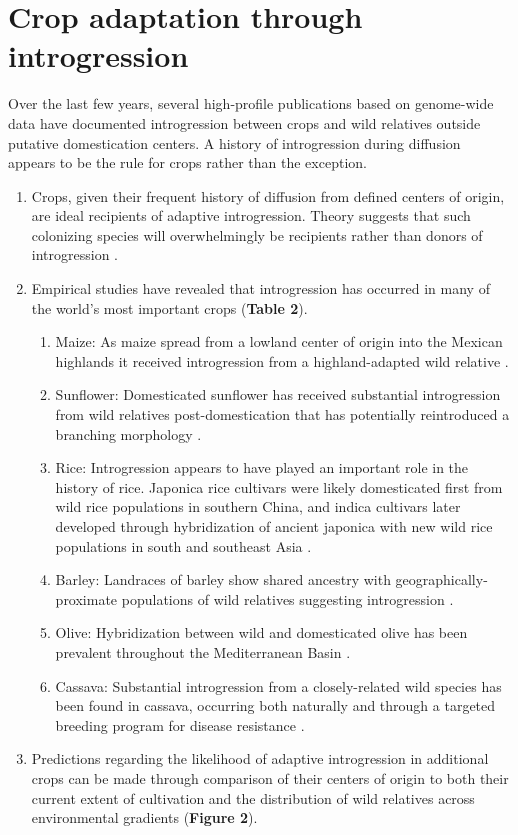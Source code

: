 \documentclass[11pt]{article}
\begin{document}
\section*{Crop adaptation through introgression}
Over the last few years, several high-profile publications based on genome-wide data have documented introgression between crops and wild relatives outside putative domestication centers. A history of introgression during diffusion appears to be the rule for crops rather than the exception.
\begin{enumerate}
	\item{Crops, given their frequent history of diffusion from defined centers of origin, are ideal recipients of adaptive introgression. Theory suggests that such colonizing species will overwhelmingly be recipients rather than donors of introgression \cite{Currat2008}.}
	\item{Empirical studies have revealed that introgression has occurred in many of the world's most important crops (\textbf{Table 2}).}
	\begin{enumerate}
		\item{Maize: As maize spread from a lowland center of origin into the Mexican highlands it received introgression from a highland-adapted wild relative \cite{Hufford2013}.}
		\item{Sunflower: Domesticated sunflower has received substantial introgression from wild relatives post-domestication that has potentially reintroduced a branching morphology \cite{Baute2015}.}
		\item{Rice: Introgression appears to have played an important role in the history of rice.  Japonica rice cultivars were likely domesticated first from wild rice populations in southern China, and indica cultivars later developed through hybridization of ancient japonica with new wild rice populations in south and southeast Asia \cite{Huang2012}.}
		\item{Barley: Landraces of barley show shared ancestry with geographically-proximate populations of wild relatives suggesting introgression \cite{Poets2015}.}
		\item{Olive: Hybridization between wild and domesticated olive has been prevalent throughout the Mediterranean Basin \cite{Diez2015}.}
		\item{Cassava: Substantial introgression from a closely-related wild species has been found in cassava, occurring both naturally and through a targeted breeding program for disease resistance \cite{Bredeson2016}.}
	\end{enumerate}
	\item{Predictions regarding the likelihood of adaptive introgression in additional crops can be made through comparison of their centers of origin to both their current extent of cultivation and the distribution of wild relatives across environmental gradients (\textbf{Figure 2}).}
\end{enumerate}
\end{document}
